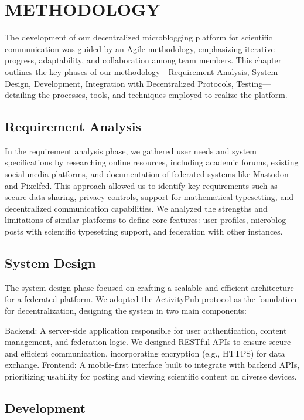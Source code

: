 \chapter{METHODOLOGY}

The development of our decentralized microblogging platform for scientific communication was guided by an Agile methodology, emphasizing iterative progress, adaptability, and collaboration among team members. This chapter outlines the key phases of our methodology—Requirement Analysis, System Design, Development, Integration with Decentralized Protocols, Testing—detailing the processes, tools, and techniques employed to realize the platform.

\section{Requirement Analysis}

In the requirement analysis phase, we gathered user needs and system specifications by researching online resources, including academic forums, existing social media platforms, and documentation of federated systems like Mastodon and Pixelfed. This approach allowed us to identify key requirements such as secure data sharing, privacy controls, support for mathematical typesetting, and decentralized communication capabilities. We analyzed the strengths and limitations of similar platforms to define core features: user profiles, microblog posts with scientific typesetting support, and federation with other instances. 

\section{System Design}

The system design phase focused on crafting a scalable and efficient architecture for a federated platform. We adopted the ActivityPub protocol as the foundation for decentralization, designing the system in two main components:

    Backend: A server-side application responsible for user authentication, content management, and federation logic. We designed RESTful APIs to ensure secure and efficient communication, incorporating encryption (e.g., HTTPS) for data exchange.
    Frontend: A mobile-first interface built to integrate with backend APIs, prioritizing usability for posting and viewing scientific content on diverse devices.


\section{Development}

